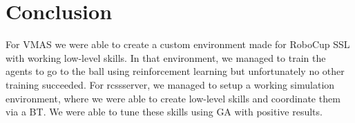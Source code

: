 \section{Conclusion}

For VMAS we were able to create a custom environment made for
RoboCup SSL with working low-level skills. In that environment, we managed to train the agents to go to the
ball using reinforcement learning but unfortunately no
other training succeeded. For rcssserver, we managed to setup a working simulation environment, where we were able to create low-level skills and
coordinate them via a BT. We were able to tune these skills using
GA with positive results.
